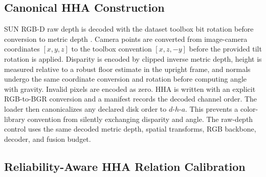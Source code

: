 \documentclass[a4paper,fleqn]{cas-dc}
\begin{document}
\subsection{Canonical HHA Construction}

SUN RGB-D raw depth is decoded with the dataset toolbox bit rotation before conversion to metric depth \citep{song2015sun}. Camera points are converted from image-camera coordinates $[x,y,z]$ to the toolbox convention $[x,z,-y]$ before the provided tilt rotation is applied. Disparity is encoded by clipped inverse metric depth, height is measured relative to a robust floor estimate in the upright frame, and normals undergo the same coordinate conversion and rotation before computing angle with gravity. Invalid pixels are encoded as zero. HHA is written with an explicit RGB-to-BGR conversion and a manifest records the decoded channel order. The loader then canonicalizes any declared disk order to $d$-$h$-$a$. This prevents a color-library convention from silently exchanging disparity and angle. The raw-depth control uses the same decoded metric depth, spatial transforms, RGB backbone, decoder, and fusion budget.

\subsection{Reliability-Aware HHA Relation Calibration}
\end{document}

